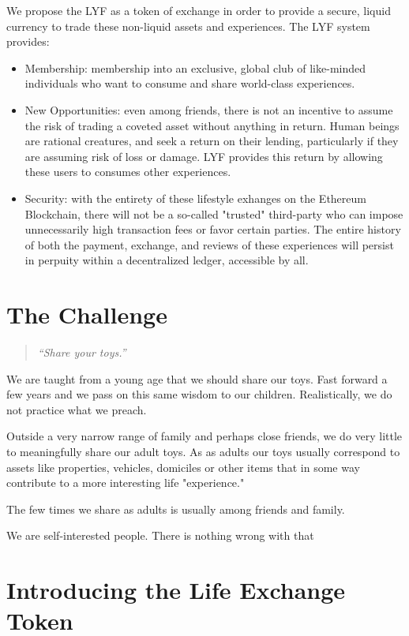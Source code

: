 \documentclass[11pt]{article}
\begin{document}
We propose the \textrm{LYF} as a token of exchange in order to provide a secure, liquid currency to trade these non-liquid assets and experiences. The \textrm{LYF} system provides: 
\begin{itemize}
\item{Membership: membership into an exclusive, global club of like-minded individuals who want to consume and share world-class experiences. }
\item{New Opportunities: even among friends, there is not an incentive to assume the risk of trading a coveted asset without anything in return. Human beings are rational creatures, and seek a return on their lending, particularly if they are assuming risk of loss or damage. LYF provides this return by allowing these users to consumes other experiences. }
\item{Security: with the entirety of these lifestyle exhanges on the Ethereum Blockchain, there will not be a so-called "trusted" third-party who can impose unnecessarily high transaction fees or favor certain parties. The entire history of both the payment, exchange, and reviews of these experiences will persist in perpuity within a decentralized ledger, accessible by all.}
\end{itemize}
\section{The Challenge}
\label{sec-3}

\begin{quote}
\textit{``Share your toys.''}
\end{quote}
We are taught from a young age that we should share our toys. Fast forward a few years and we pass on this same wisdom to our children. Realistically, we do not practice what we preach.

Outside a very narrow range of family and perhaps close friends, we do very little to meaningfully share our adult toys. As as adults our toys usually correspond to assets like properties, vehicles, domiciles or other items that in some way contribute to a more interesting life "experience."

The few times we share as adults is usually among friends and family.

We are self-interested people. There is nothing wrong with that 
\section{Introducing the Life Exchange Token}
\label{sec-4}
\end{document}
